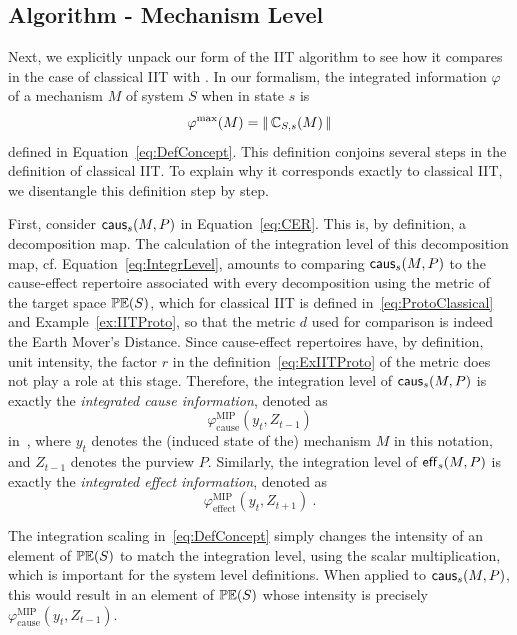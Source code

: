 \subsection{Algorithm - Mechanism Level}

Next, we explicitly unpack our form of the IIT algorithm to see how it compares in the case of classical IIT with \cite{oizumi2014phenomenology}.
In our formalism, the integrated information $\varphi$ of a mechanism $M$ of system $S$ when in state $s$ is
\begin{equation}\label{eq:APhimax}
\varphi^{\textrm{max}}(M) = \operatorname{| \hspace*{-0.1em}|} \mathbb{C}_{S,s}(M)  \operatorname{| \hspace*{-0.1em}|}
\end{equation}
defined in Equation~\eqref{eq:DefConcept}. This definition conjoins several steps in the definition of classical IIT. To explain why it corresponds exactly to classical IIT, we disentangle this definition step by step.

First, consider $\mathsf{caus}_s(M,P)$ in Equation~\eqref{eq:CER}. This is, by definition, a decomposition map. The calculation of the integration level of this decomposition map, cf. Equation~\eqref{eq:IntegrLevel}, amounts to comparing $\mathsf{caus}_s(M,P)$ to the cause-effect repertoire associated with every decomposition using the metric of the target space $\mathbb{PE}(S)$, which for classical IIT is defined in~\eqref{eq:ProtoClassical} and Example~\ref{ex:IITProto}, so that the metric $d$
used for comparison is indeed the Earth Mover's Distance. Since cause-effect repertoires have, by definition, unit intensity, the factor $r$ in the definition~\eqref{eq:ExIITProto} of the metric does not play a role at this stage. Therefore, the integration level of $\mathsf{caus}_s(M,P)$ is exactly the \emph{integrated cause information}, denoted as
\[
	\varphi_{\textrm{cause}}^{\textrm{MIP}}( y_t, Z_{t-1})
\]
in~\cite{tononi.2015.scholarpedia}, where $y_t$ denotes the (induced state of the) mechanism $M$ in this notation, and $Z_{t-1}$ denotes the purview $P$.  Similarly, the integration level of
$\mathsf{eff}_s(M,P)$ is exactly the \emph{integrated effect information}, denoted as 
\[
\varphi_{\textrm{effect}}^{\textrm{MIP}}( y_t, Z_{t+1}) \:.
\]

The integration scaling in~\eqref{eq:DefConcept} simply changes the intensity of an element of $\mathbb{PE}(S)$ to match the integration level, using the scalar multiplication, which is important for the system level definitions. When applied to $\mathsf{caus}_s(M,P)$, this would result in an element of $\mathbb{PE}(S)$ whose intensity is precisely $\varphi_{\textrm{cause}}^{\textrm{MIP}}( y_t, Z_{t-1})$.

